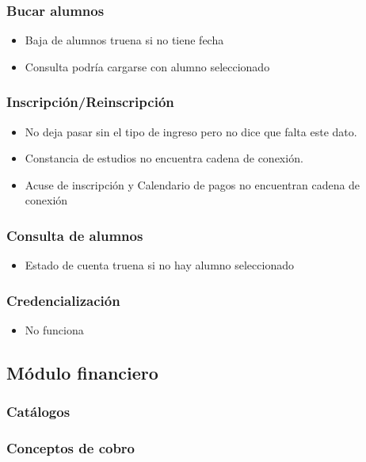 \documentclass[12pt,spanish,twocolumn]{article}
\begin{document}
\subsubsection{Bucar alumnos}
\begin{itemize}
\item Baja de alumnos truena si no tiene fecha
\item Consulta podr\'ia cargarse con alumno seleccionado
\end{itemize}

\subsubsection{Inscripci\'on/Reinscripci\'on}
\begin{itemize}
\item No deja pasar sin el tipo de ingreso pero no dice que falta este dato.
\item Constancia de estudios no encuentra cadena de conexi\'on.
\item Acuse de inscripci\'on y Calendario de pagos no encuentran cadena de conexi\'on
\end{itemize}

\subsubsection{Consulta de alumnos}
\begin{itemize}
\item Estado de cuenta truena si no hay alumno seleccionado
\end{itemize}

\subsubsection{Credencializaci\'on}
\begin{itemize}
\item No funciona
\end{itemize}

\subsection{M\'odulo financiero}
\subsubsection{Cat\'alogos}

\subsubsection{Conceptos de cobro}
\end{document}
